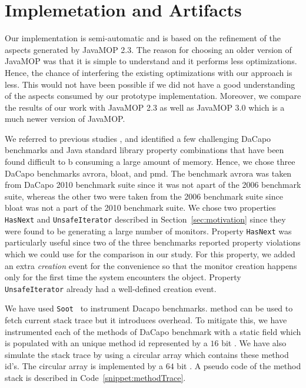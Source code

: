 \section{Implemetation and Artifacts}
\label{sec:implementation}

Our implementation is semi-automatic and is based on the refinement of the 
aspects generated by JavaMOP 2.3. The reason for choosing an older version of 
JavaMOP was that it is simple to understand and it performs less optimizations. 
Hence, the chance of interfering the existing optimizations with our approach is 
less. This would not have been possible if we did not have a good understanding 
of the aspects consumed by our prototype implementation. Moreover, we compare 
the results of our work with JavaMOP 2.3 as well as JavaMOP 3.0 which is a much 
newer version of JavaMOP. 

We referred to previous studies \cite{}, and identified a few challenging DaCapo 
benchmarks and Java standard library property combinations that have been found 
difficult to b consuming a large amount of memory. Hence, we chose three DaCapo 
benchmarks \textsf{avrora}, \textsf{bloat}, and \textsf{pmd}. The benchmark 
\textsf{avrora} was taken from DaCapo 2010 benchmark suite since it was not 
apart of the 2006 benchmark suite, whereas the other two were taken from the 
2006 benchmark suite since \textsf{bloat} was not a part of the 2010 benchmark 
suite. We chose two properties \texttt{HasNext} and \texttt{UnsafeIterator} 
described in Section~\ref{sec:motivation} since they were found to be generating 
a large number of monitors. Property \texttt{HasNext} was particularly useful 
since two of the three benchmarks reported property violations which we could 
use for the comparison in our study. For this property, we added an extra 
\textit{creation} event for the convenience so that the monitor creation happens 
only  for the first time the system encounters the object. Property 
\texttt{UnsafeIterator} already had a well-defined creation event.


 We have used \texttt{Soot}~\cite{soot} to
instrument Dacapo benchmarks.  method can be used to
fetch current stack trace but it introduces overhead. To mitigate this, we have
instrumented each of the methods of DaCapo benchmark with a static
 field which is populated with an unique method id represented by
a $16$ bit . We have also simulate the stack trace by using a
circular array which contains these method id's. The circular array is
implemented by a $64$ bit . A pseudo code of the method stack is
described in Code~\ref{snippet:methodTrace}.

